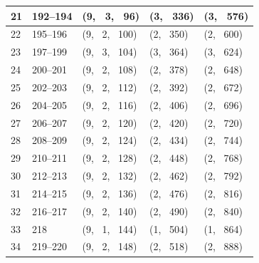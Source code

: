 \documentclass[report.tex]{subfiles}
\begin{document}
\begin{table}[ht]
\begin{tabular}{ |l|l|l|l|l| }
\hline
21 & 192--194 & (9, \ 3, \ 96) & (3, \ 336) & (3, \ 576) \\
\hline
22 & 195--196 & (9, \ 2, \ 100) & (2, \ 350) & (2, \ 600) \\
\hline
23 & 197--199 & (9, \ 3, \ 104) & (3, \ 364) & (3, \ 624) \\
\hline
24 & 200--201 & (9, \ 2, \ 108) & (2, \ 378) & (2, \ 648) \\
\hline
25 & 202--203 & (9, \ 2, \ 112) & (2, \ 392) & (2, \ 672) \\
\hline
26 & 204--205 & (9, \ 2, \ 116) & (2, \ 406) & (2, \ 696) \\
\hline
27 & 206--207 & (9, \ 2, \ 120) & (2, \ 420) & (2, \ 720) \\
\hline
28 & 208--209 & (9, \ 2, \ 124) & (2, \ 434) & (2, \ 744) \\
\hline
29 & 210--211 & (9, \ 2, \ 128) & (2, \ 448) & (2, \ 768) \\
\hline
30 & 212--213 & (9, \ 2, \ 132) & (2, \ 462) & (2, \ 792) \\
\hline
31 & 214--215 & (9, \ 2, \ 136) & (2, \ 476) & (2, \ 816) \\
\hline
32 & 216--217 & (9, \ 2, \ 140) & (2, \ 490) & (2, \ 840) \\
\hline
33 & 218 & (9, \ 1, \ 144) & (1, \ 504) & (1, \ 864) \\
\hline
34 & 219--220 & (9, \ 2, \ 148) & (2, \ 518) & (2, \ 888) \\
\hline
\end{tabular}
\end{table}
\end{document}
